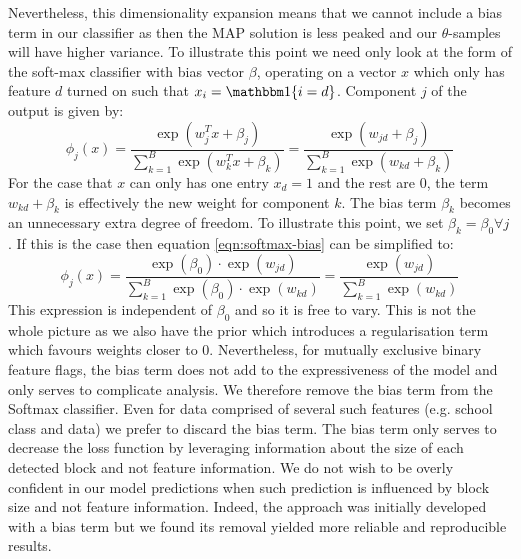 Nevertheless, this dimensionality expansion means that we cannot include a bias term in our classifier as then the MAP solution is less peaked and our $\theta$-samples will have higher variance. To illustrate this point we need only look at the form of the soft-max classifier with bias vector $\beta$, operating on a vector $x$ which only has feature $d$ turned on such that $x_i = \one\{i = d\}$. Component $j$ of the output is given by:
%
\begin{equation}
	\phi_j(x) = \frac{\exp(w_j^T x + \beta_j)}{\sum_{k=1}^{B} \exp(w_k^T x + \beta_k)} = 
	\frac{\exp(w_{jd} + \beta_j)}{\sum_{k=1}^{B} \exp({w_{kd} + \beta_k})}
	\label{eqn:softmax-bias}
\end{equation}
%
For the case that $x$ can only has one entry $x_d=1$ and the rest are 0, the term $w_{kd} + \beta_k$ is effectively the new weight for component $k$. The bias term $\beta_k$ becomes an unnecessary extra degree of freedom. To illustrate this point, we set $\beta_k=\beta_0 \forall j$. If this is the case then equation \ref{eqn:softmax-bias} can be simplified to:
%
\begin{equation}
	\phi_j(x) = \frac{\exp(\beta_0) \cdot \exp(w_{jd})}{\sum_{k=1}^{B} \exp(\beta_0) \cdot \exp(w_{kd})}
	= \frac{\exp(w_{jd})}{\sum_{k=1}^{B} \exp(w_{kd})}
\end{equation}
%
This expression is independent of $\beta_0$ and so it is free to vary. This is not the whole picture as we also have the prior which introduces a regularisation term which favours weights closer to 0. Nevertheless, for mutually exclusive binary feature flags, the bias term does not add to the expressiveness of the model and only serves to complicate analysis. We therefore remove the bias term from the Softmax classifier. Even for data comprised of several such features (e.g. school class and data) we prefer to discard the bias term. The bias term only serves to decrease the loss function by leveraging information about the size of each detected block and not feature information. We do not wish to be overly confident in our model predictions when such prediction is influenced by block size and not feature information. Indeed, the approach was initially developed with a bias term but we found its removal yielded more reliable and reproducible results. 